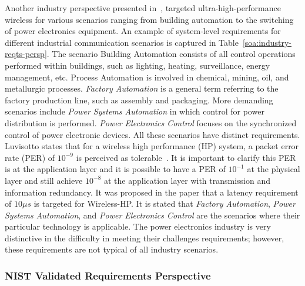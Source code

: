 Another industry perspective presented in~\cite{Luvisotto2017}, targeted ultra-high-performance wireless for various scenarios ranging from building automation to the switching of power electronics equipment. An example of system-level requirements for different industrial communication scenarios is captured in Table~\ref{soa:industry-reqts-persp}. The scenario Building Automation consists of all control operations performed within buildings, such as lighting, heating, surveillance, energy management, etc. Process Automation is involved in chemical, mining, oil, and metallurgic processes. \textit{Factory Automation} is a general term referring to the factory production line, such as assembly and packaging. More demanding scenarios include \textit{Power Systems Automation} in which control for power distribution is performed. \textit{Power Electronics Control} focuses on the synchronized control of power electronic devices. All these scenarios have distinct requirements. Luvisotto states that for a wireless high performance (HP) system, a packet error rate (PER) of $10^{-9}$ is perceived as tolerable~\cite{Luvisotto2017}. It is important to clarify this PER is at the application layer and it is possible to have a PER of $10^{-1}$ at the physical layer and still achieve $10^{-8}$ at the application layer with transmission and information redundancy. It was proposed in the paper that a latency requirement of $10{\mu}s$ is targeted for Wireless-HP. It is stated that \textit{Factory Automation}, \textit{Power Systems Automation}, and \textit{Power Electronics Control} are the scenarios where their particular technology is applicable. The power electronics industry is very distinctive in the difficulty in meeting their challenges requirements; however, these requirements are not typical of all industry scenarios.

\subsubsection{NIST Validated Requirements Perspective}\label{sec:litreview:nist}

